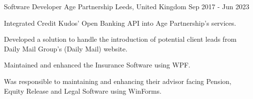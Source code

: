 \begin{cventries}
  \cventry
    {Software Developer} %
    {Age Partnership} %
    {Leeds, United Kingdom} %
    {Sep 2017 - Jun 2023} %
    {
      \begin{cvitems} %
        \item {Integrated Credit Kudos' Open Banking API into Age Partnership's services. }
        \vspace{0.7em} %
        \item {Developed a solution to handle the introduction of potential client leads from Daily Mail Group's (Daily Mail) website. }
        \vspace{0.7em} %
        \item {Maintained and enhanced the Insurance Software using WPF.}
        \vspace{0.7em} %
        \item {Was responsible to maintaining and enhancing their advisor facing Pension, Equity Release and Legal Software using WinForms.}
      \end{cvitems}
    }

\end{cventries}
